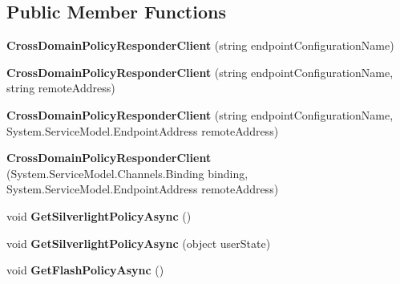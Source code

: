 \subsection*{Public Member Functions}
\begin{DoxyCompactItemize}
\item 
\hypertarget{class_cross_domain_policy_responder_client_a5bb8ef77ac406eea2c2ebfa219dc4c90}{
{\bfseries CrossDomainPolicyResponderClient} (string endpointConfigurationName)}
\label{class_cross_domain_policy_responder_client_a5bb8ef77ac406eea2c2ebfa219dc4c90}

\item 
\hypertarget{class_cross_domain_policy_responder_client_a6d7837d62f46c79003208caf6c9e4277}{
{\bfseries CrossDomainPolicyResponderClient} (string endpointConfigurationName, string remoteAddress)}
\label{class_cross_domain_policy_responder_client_a6d7837d62f46c79003208caf6c9e4277}

\item 
\hypertarget{class_cross_domain_policy_responder_client_a736bba2a16e80787c7297484d6f9ddba}{
{\bfseries CrossDomainPolicyResponderClient} (string endpointConfigurationName, System.ServiceModel.EndpointAddress remoteAddress)}
\label{class_cross_domain_policy_responder_client_a736bba2a16e80787c7297484d6f9ddba}

\item 
\hypertarget{class_cross_domain_policy_responder_client_a8597cad92f66c9a1621fbb1d77f488fa}{
{\bfseries CrossDomainPolicyResponderClient} (System.ServiceModel.Channels.Binding binding, System.ServiceModel.EndpointAddress remoteAddress)}
\label{class_cross_domain_policy_responder_client_a8597cad92f66c9a1621fbb1d77f488fa}

\item 
\hypertarget{class_cross_domain_policy_responder_client_a9a085b627bba7b3faef72a4b41a4d1fb}{
void {\bfseries GetSilverlightPolicyAsync} ()}
\label{class_cross_domain_policy_responder_client_a9a085b627bba7b3faef72a4b41a4d1fb}

\item 
\hypertarget{class_cross_domain_policy_responder_client_a4df8f68b1aa165d5032d0f824dc3dc83}{
void {\bfseries GetSilverlightPolicyAsync} (object userState)}
\label{class_cross_domain_policy_responder_client_a4df8f68b1aa165d5032d0f824dc3dc83}

\item 
\hypertarget{class_cross_domain_policy_responder_client_a50b916f19939c792d8720c460117b746}{
void {\bfseries GetFlashPolicyAsync} ()}
\label{class_cross_domain_policy_responder_client_a50b916f19939c792d8720c460117b746}


\end{DoxyCompactItemize}
